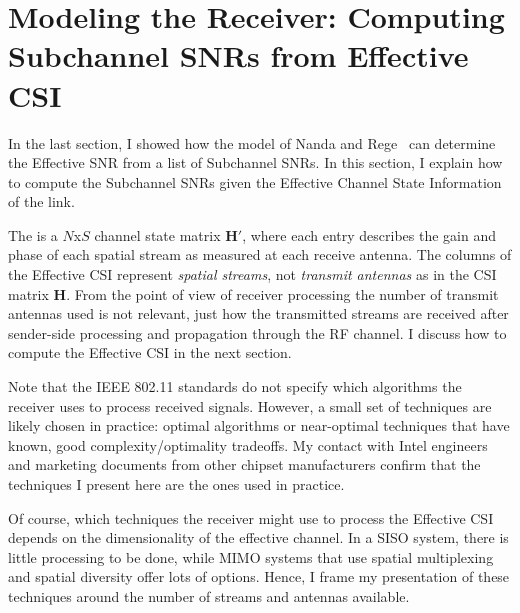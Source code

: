 
\section{Modeling the Receiver: Computing Subchannel SNRs from Effective CSI}
\label{sec:model_receiver}
In the last section, I showed how the model of Nanda and Rege~\cite{Nanda_EffectiveSNR} can determine the Effective SNR from a list of Subchannel SNRs. In this section, I explain how to compute the Subchannel SNRs given the Effective Channel State Information of the link.

The  is a $N$x$S$ channel state matrix $\mathbf{H}'$, where each entry describes the gain and phase of each spatial stream as measured at each receive antenna. The columns of the Effective CSI represent \emph{spatial streams}, not \emph{transmit antennas} as in the CSI matrix $\mathbf{H}$. From the point of view of receiver processing the number of transmit antennas used is not relevant, just how the transmitted streams are received after sender-side processing and propagation through the RF channel. I discuss how to compute the Effective CSI in the next section.

Note that the IEEE 802.11 standards do not specify which algorithms the receiver uses to process received signals. However, a small set of techniques are likely chosen in practice: optimal algorithms or near-optimal techniques that have known, good complexity/optimality tradeoffs. My contact with Intel engineers and marketing documents from other chipset manufacturers confirm that the techniques I present here are the ones used in practice.

Of course, which techniques the receiver might use to process the Effective CSI depends on the dimensionality of the effective channel. In a SISO system, there is little processing to be done, while MIMO systems that use spatial multiplexing and spatial diversity offer lots of options. Hence, I frame my presentation of these techniques around the number of streams and antennas available.

